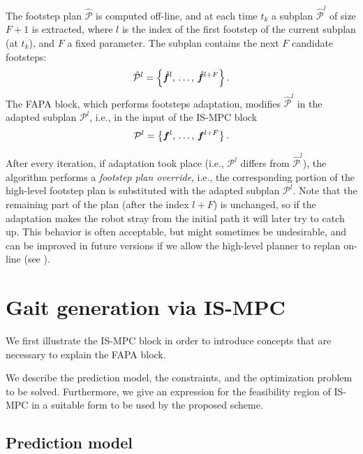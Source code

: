 The footstep plan $\mathcal{\hat P}$ is computed off-line, and at each time $t_k$ a subplan $\mathcal{\hat P}^l$ of size $F+1$ is extracted, where $l$ is the index of the first footstep of the current subplan (at $t_k$), and $F$ a fixed parameter. The subplan contains the next $F$ candidate footsteps:
\begin{equation*}
\mathcal{\hat P}^l = \left\{
\hat{{\bm{f}}}^{l},\,\dots,\,\hat{{\bm{f}}}^{l+F}
\right\}.
\end{equation*}
The FAPA block, which performs footsteps adaptation, modifies $\mathcal{\hat P}^l$ in the adapted subplan $\mathcal{P}^l$, i.e., in the input of the IS-MPC block
\begin{equation*}
\mathcal{P}^l = \left\{
{\bm{f}}^{l},\,\dots,\,{\bm{f}}^{l+F}
\right\}.
\end{equation*}

After every iteration, if adaptation took place (i.e., $\mathcal{P}^l$ differs from $\mathcal{\hat P}^l$), the algorithm performs a {\em footstep plan override}, i.e., the corresponding portion of the high-level footstep plan is substituted with the adapted subplan $\mathcal{P}^l$. Note that the remaining part of the plan (after the index $l+F$) is unchanged, so if the adaptation makes the robot stray from the initial path it will later try to catch up. This behavior is often acceptable, but might sometimes be undesirable, and can be improved in future versions if we allow the high-level planner to replan on-line (see \cite{Cipriano2023RAS}).

\section{Gait generation via IS-MPC}
\label{sec:FAPA:GaitGeneration}

We first illustrate the IS-MPC block in order to introduce concepts that are necessary to explain the FAPA block.

We describe the prediction model, the constraints, and the optimization problem to be solved. Furthermore, we give an expression for the feasibility region of IS-MPC in a suitable form to be used by the proposed scheme.

\subsection{Prediction model}

